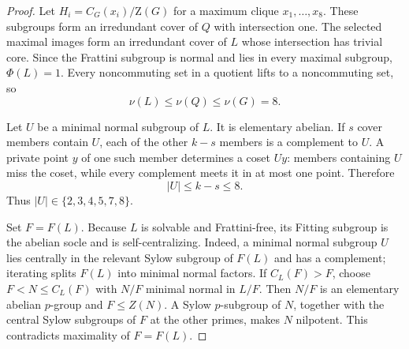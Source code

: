 \documentclass[11pt]{article}
\theoremstyle{remark}
\newcommand{\nuG}{\nu}
\newcommand{\Z}{\mathrm Z}
\begin{document}
\begin{proof}
Let $H_i=C_G(x_i)/\Z(G)$ for a maximum clique
$x_1,\ldots,x_8$.  These subgroups form an irredundant cover of $Q$ with
intersection one.  The selected maximal images form an irredundant cover of
$L$ whose intersection has trivial core.  Since the Frattini subgroup is
normal and lies in every maximal subgroup, $\Phi(L)=1$.
Every noncommuting set in a quotient lifts to a noncommuting set, so
\[
 \nuG(L)\le\nuG(Q)\le\nuG(G)=8.
\]

Let $U$ be a minimal normal subgroup of $L$.  It is elementary abelian.
If $s$ cover members contain $U$, each of the other $k-s$ members is a
complement to $U$.  A private point $y$ of one such member determines a
coset $Uy$: members containing $U$ miss the coset, while every complement
meets it in at most one point.  Therefore
\[
 |U|\le k-s\le8.
\]
Thus $|U|\in\{2,3,4,5,7,8\}$.

Set $F=F(L)$.  Because $L$ is solvable and Frattini-free, its Fitting
subgroup is the abelian socle and is self-centralizing.  Indeed, a minimal normal subgroup
$U$ lies centrally in the relevant Sylow subgroup of $F(L)$ and has a
complement; iterating splits $F(L)$ into minimal normal factors.  If
$C_L(F)>F$, choose $F<N\le C_L(F)$ with $N/F$ minimal normal in $L/F$.
Then $N/F$ is an elementary abelian $p$-group and $F\le Z(N)$.  A Sylow
$p$-subgroup of $N$, together with the central Sylow subgroups of $F$ at
the other primes, makes $N$ nilpotent.  This contradicts maximality of
$F=F(L)$.


\end{proof}
\end{document}
